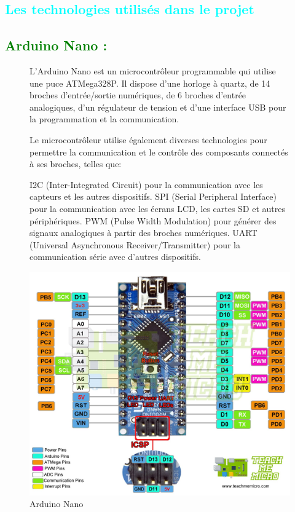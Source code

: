 \begin{flushleft}
	\section{\textcolor{cyan}{Les technologies utilisés dans le projet}}
	\subsection{\textcolor{green}{Arduino Nano :}}
	\begin{figure}[h]
		\begin{minipage}{0.6\textwidth}
		L'Arduino Nano est un microcontrôleur programmable qui utilise une puce ATMega328P. Il dispose d'une horloge à quartz, de 14 broches d'entrée/sortie numériques, de 6 broches d'entrée analogiques, d'un régulateur de tension et d'une interface USB pour la programmation et la communication.
		
		Le microcontrôleur utilise également diverses technologies pour permettre la communication et le contrôle des composants connectés à ses broches, telles que:
		
		I2C (Inter-Integrated Circuit) pour la communication avec les capteurs et les autres dispositifs.
		SPI (Serial Peripheral Interface) pour la communication avec les écrans LCD, les cartes SD et autres périphériques.
		PWM (Pulse Width Modulation) pour générer des signaux analogiques à partir des broches numériques.
		UART (Universal Asynchronous Receiver/Transmitter) pour la communication série avec d'autres dispositifs.
		
		\end{minipage}
		\begin{minipage}{0.4\textwidth}
			\centering
			\includegraphics[width=\textwidth]{chapitres/images/Arduino-Nano-pinout.jpg}
			\caption{Arduino Nano}
			\label{fig:votre_image}
		\end{minipage}
	\end{figure}

\end{flushleft}
